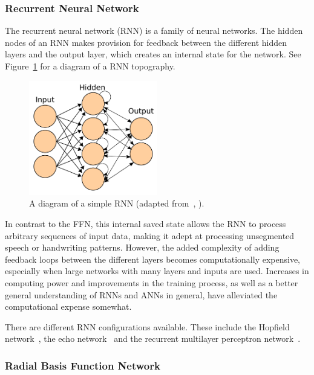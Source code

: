 \subsubsection{Recurrent Neural Network}

The recurrent neural network (RNN) is a family of neural networks. The hidden nodes of an RNN makes provision for feedback between the different hidden layers and the output layer, which creates an internal state for the network. See Figure~\ref{fig:chap2-rnn-diagram} for a diagram of a RNN topography.

\begin{figure}
 \centering
 \includegraphics[width=0.5\textwidth]{figures/chapter2/rnn_diagram}
 \caption[A diagram of a simple RNN.]{A diagram of a simple RNN (adapted from~\citeauthor{ann-wiki-pic}, \citeyear{ann-wiki-pic}).}
\label{fig:chap2-rnn-diagram}
\end{figure}

In contrast to the FFN, this internal saved state allows the RNN to process arbitrary sequences of input data, making it adept at processing unsegmented speech or handwriting patterns. However, the added complexity of adding feedback loops between the different layers becomes computationally expensive, especially when large networks with many layers and inputs are used. Increases in computing power and improvements in the training process, as well as a better general understanding of RNNs and ANNs in general, have alleviated the computational expense somewhat.

There are different RNN configurations available. These include the Hopfield network~\citep{hopfield1982neural}, the echo network~\citep{jaeger2001echo} and the recurrent multilayer perceptron network~\citep{tutschku1995recurrent}.

\subsubsection{Radial Basis Function Network}

